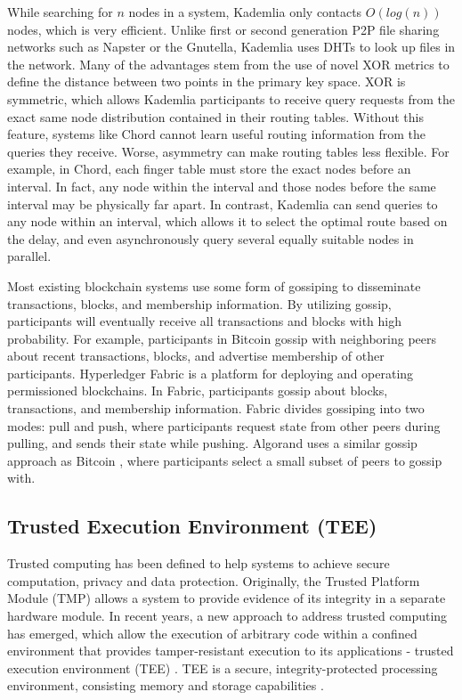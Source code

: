 While searching for $n$ nodes in a system, Kademlia only contacts $O(log(n))$ nodes, which is very efficient. Unlike first or second generation P2P file sharing networks such as Napster\cite{saroiu2001measurement} or the Gnutella\cite{ripeanu2001peer}, Kademlia uses DHTs to look up files in the network. Many of the advantages stem from the use of novel XOR metrics to define the distance between two points in the primary key space. XOR is symmetric, which allows Kademlia participants to receive query requests from the exact same node distribution contained in their routing tables. Without this feature, systems like Chord cannot learn useful routing information from the queries they receive. Worse, asymmetry can make routing tables less flexible. For example, in Chord, each finger table must store the exact nodes before an interval. In fact, any node within the interval and those nodes before the same interval may be physically far apart. In contrast, Kademlia can send queries to any node within an interval, which allows it to select the optimal route based on the delay, and even asynchronously query several equally suitable nodes in parallel.

Most existing blockchain systems use some form of gossiping to disseminate transactions, blocks, and membership information. By utilizing gossip, participants will eventually receive all transactions and blocks with high probability. For example, participants in Bitcoin \cite{nakamoto2008bitcoin} gossip with neighboring peers about recent transactions, blocks, and advertise membership of other participants. Hyperledger Fabric \cite{androulaki2018hyperledger} is a platform for deploying and operating permissioned blockchains. In Fabric, participants gossip about blocks, transactions, and membership information. Fabric divides gossiping into two modes: pull and push, where participants request state from other peers during pulling, and sends their state while pushing. Algorand \cite{gilad2017algorand} uses a similar gossip approach as Bitcoin \cite{nakamoto2008bitcoin}, where participants select a small subset of peers to gossip with.

\subsection{Trusted Execution Environment (TEE)}

Trusted computing has been defined to help systems to achieve secure computation, privacy and data protection. Originally, the Trusted Platform Module (TMP) allows a system to provide evidence of its integrity in a separate hardware module. In recent years, a new approach to address trusted computing has emerged, which allow the execution of arbitrary code within a confined environment that provides tamper-resistant execution to its applications - trusted execution environment (TEE) \cite{sabt2015trusted}. TEE is a secure, integrity-protected processing environment, consisting memory and storage capabilities \cite{asokan2014mobile}.

